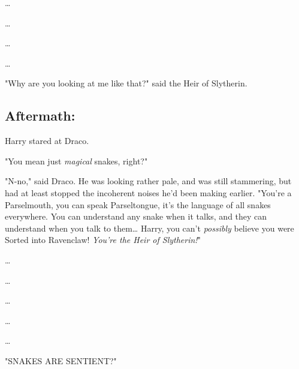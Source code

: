 {\ldots}

{\ldots}

{\ldots}

{\ldots}

"Why are you looking at me like that?" said the Heir of Slytherin.
\sbreak
\vspace{-2\baselineskip}
\subsection{Aftermath:}

Harry stared at Draco.

"You mean just \emph{magical} snakes, right?"

"N-no," said Draco. He was looking rather pale, and was still stammering, but 
had at least stopped the incoherent noises he'd been making earlier. "You're a 
Parselmouth, you can speak Parseltongue, it's the language of all snakes 
everywhere. You can understand any snake when it talks, and they can understand 
when you talk to them{\ldots} Harry, you can't \emph{possibly} believe you were 
Sorted into Ravenclaw! \emph{You're the Heir of Slytherin!}"

{\ldots}

{\ldots}

{\ldots}

{\ldots}

{\ldots}

"SNAKES ARE SENTIENT?"
